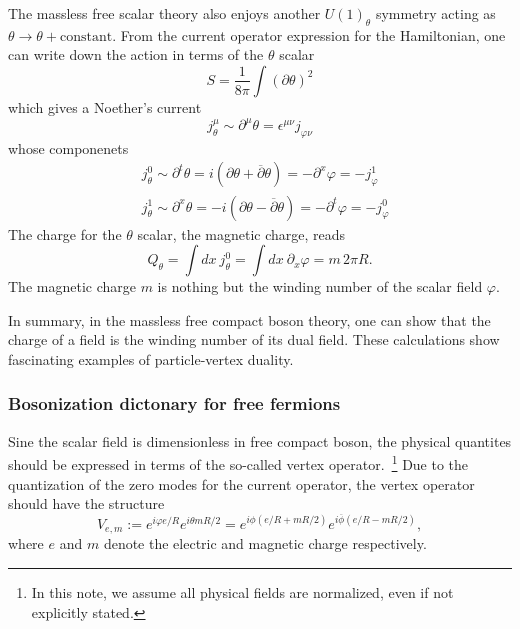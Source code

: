 \documentclass[submission, PhysLectNotes]{SciPost}
\begin{document}
The massless free scalar theory also enjoys another ${U(1)}_\theta$ symmetry acting as $\theta \rightarrow \theta + \mathrm{constant}$. From the current operator expression for the Hamiltonian, one can write down the action in terms of the $\theta$ scalar
\begin{equation}
	S = \frac{1}{8\pi}\int {\left(\partial \theta\right)}^2
\end{equation}
which gives a Noether's current
\begin{equation}
	j^\mu_\theta \sim \partial^\mu \theta = \epsilon^{\mu\nu}j_{\varphi\nu}
\end{equation}
whose componenets
\begin{equation}
	\begin{aligned}
		&j^0_\theta \sim \partial^t\theta = i \left(\partial \theta + \overline{\partial} {\theta}\right) = -\partial^x \varphi = -j^1_\varphi\\
		&j^1_\theta \sim \partial^x\theta = -i\left( \partial \theta - \overline{\partial}\theta \right) = -\partial^t \varphi = -j^0_\varphi
	\end{aligned}
\end{equation}
The charge for the $\theta$ scalar, the magnetic charge, reads
\begin{equation}
	Q_\theta = \int dx \ j^0_\theta = \int dx \ \partial_x \varphi = m\,2\pi R.
\end{equation}
The magnetic charge $m$ is nothing but the winding number of the scalar field $\varphi$.

In summary, in the massless free compact boson theory, one can show that the charge of a field is the winding number of its dual field. These calculations show fascinating examples of particle-vertex duality. 


\subsubsection{Bosonization dictonary for free fermions}
Sine the scalar field is dimensionless in free compact boson, the physical quantites should be expressed in terms of the so-called vertex operator.~\footnote{In this note, we assume all physical fields are normalized, even if not explicitly stated.} Due to the quantization of the zero modes for the current operator, the vertex operator should have the structure 
\begin{equation}
	V_{e,m} := e^{i \varphi e/R} e^{i\theta m R/2} = e^{i\phi \left(e/R + mR/2\right)} e^{i\overline{\phi} \left(e/R - mR/2\right)},	
\end{equation}
where $e$ and $m$ denote the electric and magnetic charge respectively.
\end{document}
